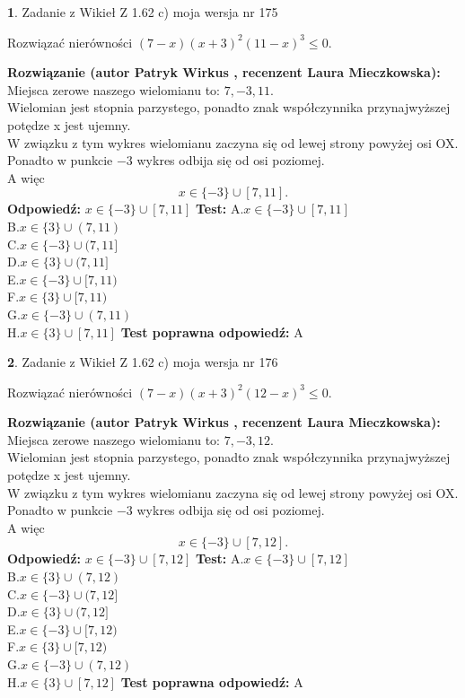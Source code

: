 \documentclass[12pt, a4paper]{article}
\theoremstyle{definition} %
\newtheorem{zad}{}
\newcommand{\zadStart}[1]{\begin{zad}#1\newline}
\newcommand{\zadStop}{\end{zad}}
\newcommand{\rozwStart}[2]{\noindent \textbf{Rozwiązanie (autor #1 , recenzent #2): }\newline}
\newcommand{\rozwStop}{\newline}
\newcommand{\odpStart}{\noindent \textbf{Odpowiedź:}\newline}
\newcommand{\odpStop}{\newline}
\newcommand{\testStart}{\noindent \textbf{Test:}\newline}
\newcommand{\testStop}{\newline}
\newcommand{\kluczStart}{\noindent \textbf{Test poprawna odpowiedź:}\newline}
\newcommand{\kluczStop}{\newline}
\begin{document}
\zadStart{Zadanie z Wikieł Z 1.62 c) moja wersja nr 175}

Rozwiązać nierówności $(7-x)(x+3)^{2}(11-x)^{3}\le0$.
\zadStop
\rozwStart{Patryk Wirkus}{Laura Mieczkowska}
Miejsca zerowe naszego wielomianu to: $7, -3, 11$.\\
Wielomian jest stopnia parzystego, ponadto znak współczynnika przy\linebreak najwyższej potędze x jest ujemny.\\ W związku z tym wykres wielomianu zaczyna się od lewej strony powyżej osi OX.\\
Ponadto w punkcie $-3$ wykres odbija się od osi poziomej.\\
A więc $$x \in \{-3\} \cup [7,11].$$
\rozwStop
\odpStart
$x \in \{-3\} \cup [7,11]$
\odpStop
\testStart
A.$x \in \{-3\} \cup [7,11]$\\
B.$x \in \{3\} \cup (7,11)$\\
C.$x \in \{-3\} \cup (7,11]$\\
D.$x \in \{3\} \cup (7,11]$\\
E.$x \in \{-3\} \cup [7,11)$\\
F.$x \in \{3\} \cup [7,11)$\\
G.$x \in \{-3\} \cup (7,11)$\\
H.$x \in \{3\} \cup [7,11]$
\testStop
\kluczStart
A
\kluczStop



\zadStart{Zadanie z Wikieł Z 1.62 c) moja wersja nr 176}

Rozwiązać nierówności $(7-x)(x+3)^{2}(12-x)^{3}\le0$.
\zadStop
\rozwStart{Patryk Wirkus}{Laura Mieczkowska}
Miejsca zerowe naszego wielomianu to: $7, -3, 12$.\\
Wielomian jest stopnia parzystego, ponadto znak współczynnika przy\linebreak najwyższej potędze x jest ujemny.\\ W związku z tym wykres wielomianu zaczyna się od lewej strony powyżej osi OX.\\
Ponadto w punkcie $-3$ wykres odbija się od osi poziomej.\\
A więc $$x \in \{-3\} \cup [7,12].$$
\rozwStop
\odpStart
$x \in \{-3\} \cup [7,12]$
\odpStop
\testStart
A.$x \in \{-3\} \cup [7,12]$\\
B.$x \in \{3\} \cup (7,12)$\\
C.$x \in \{-3\} \cup (7,12]$\\
D.$x \in \{3\} \cup (7,12]$\\
E.$x \in \{-3\} \cup [7,12)$\\
F.$x \in \{3\} \cup [7,12)$\\
G.$x \in \{-3\} \cup (7,12)$\\
H.$x \in \{3\} \cup [7,12]$
\testStop
\kluczStart
A
\kluczStop
\end{document}
